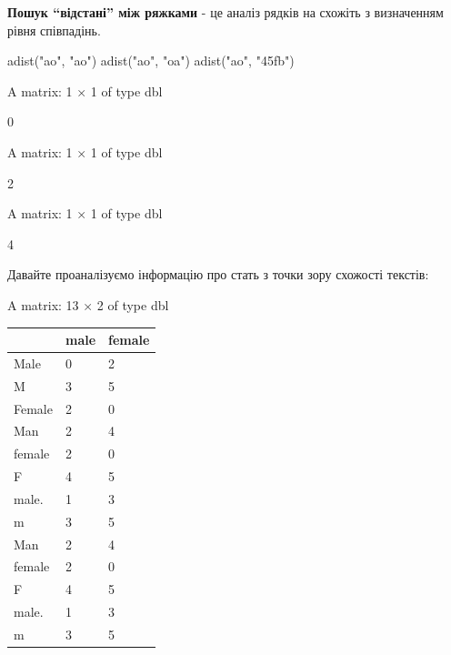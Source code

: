 \documentclass[
  letterpaper,
  DIV=11,
  numbers=noendperiod]{scrreprt}
\newenvironment{Shaded}{\begin{snugshade}}{\end{snugshade}}
\newcommand{\CommentTok}[1]{\textcolor[rgb]{0.37,0.37,0.37}{#1}}
\newcommand{\FunctionTok}[1]{\textcolor[rgb]{0.28,0.35,0.67}{#1}}
\newcommand{\NormalTok}[1]{\textcolor[rgb]{0.00,0.23,0.31}{#1}}
\newcommand{\OtherTok}[1]{\textcolor[rgb]{0.00,0.23,0.31}{#1}}
\newcommand{\SpecialCharTok}[1]{\textcolor[rgb]{0.37,0.37,0.37}{#1}}
\newcommand{\StringTok}[1]{\textcolor[rgb]{0.13,0.47,0.30}{#1}}
\begin{document}
\textbf{Пошук ``відстані'' між ряжками} - це аналіз рядків на схожіть з
визначенням рівня співпадінь.

\begin{Shaded}
\begin{Highlighting}[]
\FunctionTok{adist}\NormalTok{(}\StringTok{"ao"}\NormalTok{, }\StringTok{"ao"}\NormalTok{)}
\FunctionTok{adist}\NormalTok{(}\StringTok{"ao"}\NormalTok{, }\StringTok{"oa"}\NormalTok{)}
\FunctionTok{adist}\NormalTok{(}\StringTok{"ao"}\NormalTok{, }\StringTok{"45fb"}\NormalTok{)}
\end{Highlighting}
\end{Shaded}

A matrix: 1 × 1 of type dbl

0 \textbar{}

A matrix: 1 × 1 of type dbl

2 \textbar{}

A matrix: 1 × 1 of type dbl

4 \textbar{}

Давайте проаналізуємо інформацію про стать з точки зору схожості
текстів:

\begin{Shaded}
\end{Shaded}

A matrix: 13 × 2 of type dbl

\begin{longtable}[]{@{}lll@{}}
\toprule\noalign{}
& male & female \\
\midrule\noalign{}
\endhead
\bottomrule\noalign{}
\endlastfoot
Male & 0 & 2 \\
M & 3 & 5 \\
Female & 2 & 0 \\
Man & 2 & 4 \\
female & 2 & 0 \\
F & 4 & 5 \\
male. & 1 & 3 \\
m & 3 & 5 \\
Man & 2 & 4 \\
female & 2 & 0 \\
F & 4 & 5 \\
male. & 1 & 3 \\
m & 3 & 5 \\
\end{longtable}
\end{document}
